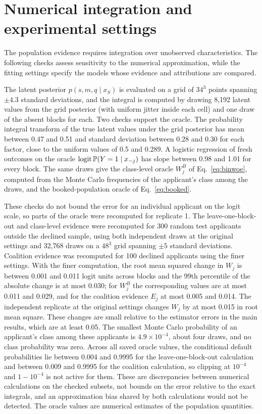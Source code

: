 \section{Numerical integration and experimental settings}\label{app:computation}

The population evidence requires integration over unobserved characteristics. The following checks assess sensitivity to the numerical approximation, while the fitting settings specify the models whose evidence and attributions are compared.

The latent posterior $p(s,m,q\mid x_S)$ is evaluated on a grid of $34^3$ points spanning $\pm4.3$ standard deviations, and the integral is computed by drawing 8{,}192 latent values from the grid posterior (with uniform jitter inside each cell) and one draw of the absent blocks for each. Two checks support the oracle. The probability integral transform of the true latent values under the grid posterior has mean between 0.47 and 0.51 and standard deviation between 0.28 and 0.30 for each factor, close to the uniform values of 0.5 and 0.289. A logistic regression of fresh outcomes on the oracle $\operatorname{logit}\mathbb P(Y=1\mid x_{-j})$ has slope between 0.98 and 1.01 for every block. The same draws give the class-level oracle $W^B_j$ of Eq.~\eqref{eq:binwoe}, computed from the Monte Carlo frequencies of the applicant's class among the draws, and the booked-population oracle of Eq.~\eqref{eq:booked}.

These checks do not bound the error for an individual applicant on the logit scale, so parts of the oracle were recomputed for replicate 1. The leave-one-block-out and class-level evidence were recomputed for 300 random test applicants outside the declined sample, using both independent draws at the original settings and 32{,}768 draws on a $48^3$ grid spanning $\pm5$ standard deviations. Coalition evidence was recomputed for 100 declined applicants using the finer settings. With the finer computation, the root mean squared change in $W_j$ is between 0.001 and 0.011 logit units across blocks and the 99th percentile of the absolute change is at most 0.030; for $W^B_j$ the corresponding values are at most 0.011 and 0.029, and for the coalition evidence $E_j$ at most 0.005 and 0.014. The independent replicate at the original settings changes $W_j$ by at most 0.015 in root mean square. These changes are small relative to the estimator errors in the main results, which are at least 0.05. The smallest Monte Carlo probability of an applicant's class among these applicants is $4.9\times10^{-4}$, about four draws, and no class probability was zero. Across all saved oracle values, the conditional default probabilities lie between 0.004 and 0.9995 for the leave-one-block-out calculation and between 0.009 and 0.9995 for the coalition calculation, so clipping at $10^{-4}$ and $1-10^{-4}$ is not active for them. These are discrepancies between numerical calculations on the checked subsets, not bounds on the error relative to the exact integrals, and an approximation bias shared by both calculations would not be detected. The oracle values are numerical estimates of the population quantities.

